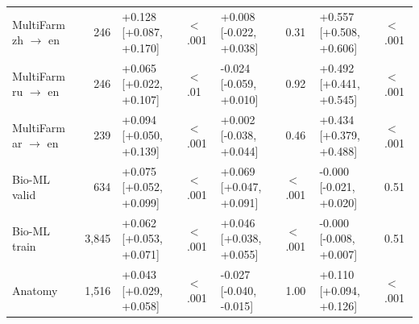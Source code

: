 \begin{tabular}{@{}lrllllll@{}}
MultiFarm zh $\to$ en & 246 & +0.128 [+0.087, +0.170] & $<$.001 & +0.008 [-0.022, +0.038] & 0.31 & +0.557 [+0.508, +0.606] & $<$.001 \\
MultiFarm ru $\to$ en & 246 & +0.065 [+0.022, +0.107] & $<$.01 & -0.024 [-0.059, +0.010] & 0.92 & +0.492 [+0.441, +0.545] & $<$.001 \\
MultiFarm ar $\to$ en & 239 & +0.094 [+0.050, +0.139] & $<$.001 & +0.002 [-0.038, +0.044] & 0.46 & +0.434 [+0.379, +0.488] & $<$.001 \\
Bio-ML valid & 634 & +0.075 [+0.052, +0.099] & $<$.001 & +0.069 [+0.047, +0.091] & $<$.001 & -0.000 [-0.021, +0.020] & 0.51 \\
Bio-ML train & 3,845 & +0.062 [+0.053, +0.071] & $<$.001 & +0.046 [+0.038, +0.055] & $<$.001 & -0.000 [-0.008, +0.007] & 0.51 \\
Anatomy & 1,516 & +0.043 [+0.029, +0.058] & $<$.001 & -0.027 [-0.040, -0.015] & 1.00 & +0.110 [+0.094, +0.126] & $<$.001 \\
\bottomrule
\end{tabular}
